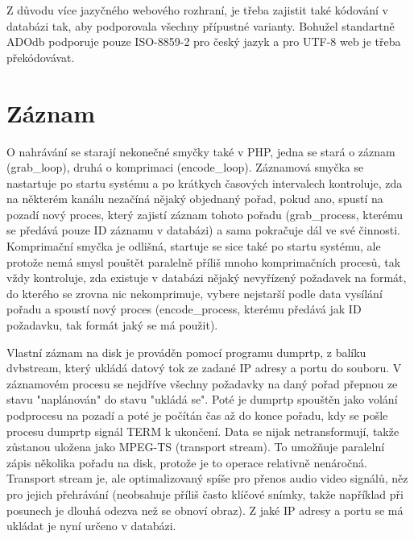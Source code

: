 \vspace{10pt}

Z důvodu více jazyčného webového rozhraní, je třeba zajistit také kódování v databázi tak, aby podporovala všechny přípustné varianty. Bohužel standartně ADOdb podporuje pouze ISO-8859-2 pro český jazyk a pro UTF-8 web je třeba překódovávat.

\vspace{10pt}

\section{Záznam}

O nahrávání se starají nekonečné smyčky také v PHP, jedna se stará o záznam (grab\_loop), druhá o komprimaci (encode\_loop). Záznamová smyčka se nastartuje po startu systému a po krátkych časových intervalech kontroluje, zda na některém kanálu nezačíná nějaký objednaný pořad, pokud ano, spustí na pozadí nový proces, který zajistí záznam tohoto pořadu (grab\_process, kterému se předává pouze ID záznamu v databázi) a sama pokračuje dál ve své činnosti. Komprimační smyčka je odlišná, startuje se sice také po startu systému, ale protože nemá smysl pouštět paralelně příliš mnoho komprimačních procesů, tak vždy kontroluje, zda existuje v databázi nějaký nevyřízený požadavek na formát, do kterého se zrovna nic nekomprimuje, vybere nejstarší podle data vysílání pořadu a spoustí nový proces (encode\_process, kterému předává jak ID požadavku, tak formát jaký se má použit).

\vspace{10pt}

Vlastní záznam na disk je prováděn pomocí programu dumprtp, z balíku dvbstream, který ukládá datový tok ze zadané IP adresy a portu do souboru. V záznamovém procesu se nejdříve všechny požadavky na daný pořad přepnou ze stavu "naplánován" do stavu "ukládá se". Poté je dumprtp spouštěn jako volání podprocesu na pozadí a poté je počítán čas až do konce pořadu, kdy se pošle procesu dumprtp signál TERM k ukončení. Data se nijak netransformují, takže zůstanou uložena jako MPEG-TS (transport stream). To umožňuje paralelní zápis několika pořadu na disk, protože je to operace relativně nenáročná. Transport stream je, ale optimalizovaný spíše pro přenos audio video signálů, něz pro jejich přehrávání (neobsahuje příliš často klíčové snímky, takže například při posunech je dlouhá odezva než se obnoví obraz). Z jaké IP adresy a portu se má ukládat je nyní určeno v databázi.

